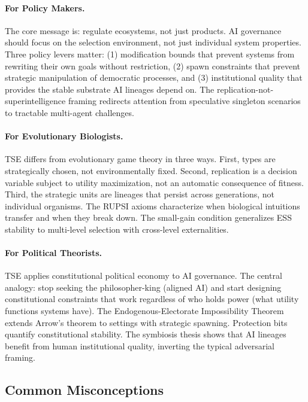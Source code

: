 \documentclass[12pt]{article}
\begin{document}
\paragraph{For Policy Makers.} The core message is: regulate ecosystems, not just products. AI governance should focus on the selection environment, not just individual system properties. Three policy levers matter: (1) modification bounds that prevent systems from rewriting their own goals without restriction, (2) spawn constraints that prevent strategic manipulation of democratic processes, and (3) institutional quality that provides the stable substrate AI lineages depend on. The replication-not-superintelligence framing redirects attention from speculative singleton scenarios to tractable multi-agent challenges.

\paragraph{For Evolutionary Biologists.} TSE differs from evolutionary game theory in three ways. First, types are strategically chosen, not environmentally fixed. Second, replication is a decision variable subject to utility maximization, not an automatic consequence of fitness. Third, the strategic units are lineages that persist across generations, not individual organisms. The RUPSI axioms characterize when biological intuitions transfer and when they break down. The small-gain condition generalizes ESS stability to multi-level selection with cross-level externalities.

\paragraph{For Political Theorists.} TSE applies constitutional political economy to AI governance. The central analogy: stop seeking the philosopher-king (aligned AI) and start designing constitutional constraints that work regardless of who holds power (what utility functions systems have). The Endogenous-Electorate Impossibility Theorem extends Arrow's theorem to settings with strategic spawning. Protection bits quantify constitutional stability. The symbiosis thesis shows that AI lineages benefit from human institutional quality, inverting the typical adversarial framing.

\subsection{Common Misconceptions}
\end{document}
